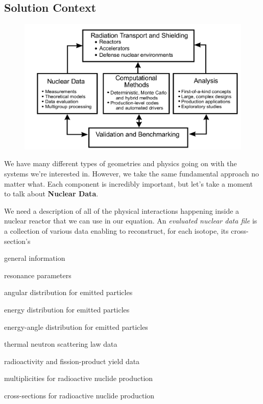 \documentclass[12pt]{article}
\begin{document}
\subsection*{Solution Context}%
\begin{figure}[h!]
    \begin{center}
    \includegraphics[keepaspectratio, width = 4.5 in]{solver-map}
    \end{center}
    \label{fig:context}
\end{figure}
%
We have many different types of geometries and physics going on with the systems we're interested in. However, we take the same fundamental approach no matter what. Each component is incredibly important, but let's take a moment to talk about \textbf{Nuclear Data}.

We need a description of all of the physical interactions happening inside a nuclear reactor that we can use in our equation. An \textit{evaluated nuclear data file} is a collection of various data enabling to reconstruct, for each isotope, its cross-section's 
\begin{compactitem}
\item general information
\item resonance parameters 
\item angular distribution for emitted particles 
\item energy distribution for emitted particles 
\item energy-angle distribution for emitted particles 
\item thermal neutron scattering law data 
\item radioactivity and fission-product yield data 
\item multiplicities for radioactive nuclide production 
\item cross-sections for radioactive nuclide production
\end{compactitem}
\end{document}
